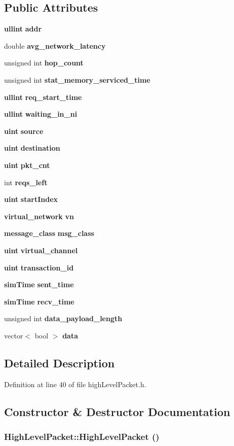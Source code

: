 \subsection*{Public Attributes}
\begin{CompactItemize}
\item 
{\bf ullint} {\bf addr}
\item 
double {\bf avg\_\-network\_\-latency}
\item 
unsigned int {\bf hop\_\-count}
\item 
unsigned int {\bf stat\_\-memory\_\-serviced\_\-time}
\item 
{\bf ullint} {\bf req\_\-start\_\-time}
\item 
{\bf ullint} {\bf waiting\_\-in\_\-ni}
\item 
{\bf uint} {\bf source}
\item 
{\bf uint} {\bf destination}
\item 
{\bf uint} {\bf pkt\_\-cnt}
\item 
int {\bf reqs\_\-left}
\item 
{\bf uint} {\bf startIndex}
\item 
{\bf virtual\_\-network} {\bf vn}
\item 
{\bf message\_\-class} {\bf msg\_\-class}
\item 
{\bf uint} {\bf virtual\_\-channel}
\item 
{\bf uint} {\bf transaction\_\-id}
\item 
{\bf simTime} {\bf sent\_\-time}
\item 
{\bf simTime} {\bf recv\_\-time}
\item 
unsigned int {\bf data\_\-payload\_\-length}
\item 
vector$<$ bool $>$ {\bf data}
\end{CompactItemize}


\subsection{Detailed Description}


Definition at line 40 of file highLevelPacket.h.

\subsection{Constructor \& Destructor Documentation}
\subsubsection[{HighLevelPacket}]{\setlength{\rightskip}{0pt plus 5cm}HighLevelPacket::HighLevelPacket ()}\label{classHighLevelPacket_e6f7a4ec429537928d24f6a2199a3f8d}




